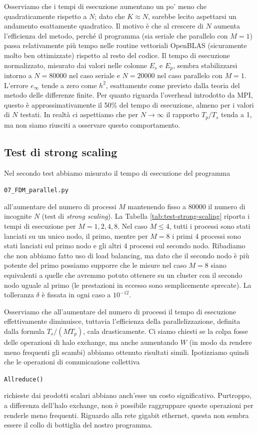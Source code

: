 \documentclass[a4paper,11pt]{article}
\newcommand{\code}[1]{\begin{small}\texttt{#1}\end{small}}
\begin{document}
Osserviamo che i tempi di esecuzione aumentano un po'
meno che quadraticamente rispetto a $N$; dato che
$K \approx N$, sarebbe lecito aspettarsi un andamento
esattamente quadratico. Il motivo è che al crescere
di $N$ aumenta l'efficienza del metodo, perché il programma
(sia seriale che parallelo con $M = 1$) passa relativamente più
tempo nelle routine vettoriali OpenBLAS
(sicuramente molto ben ottimizzate) rispetto al resto
del codice. Il tempo di esecuzione normalizzato, misurato dai
valori nelle colonne $E_s$ e $E_p$, sembra stabilizzarsi
intorno a $N = 80000$ nel caso seriale e $N = 20000$ nel
caso parallelo con $M = 1$.
L'errore $e_\infty$ tende a zero come $h^2$, esattamente
come previsto dalla teoria del metodo delle differenze finite.
Per quanto riguarda l'overhead introdotto da MPI, questo
è approssimativamente il 50\% del tempo di esecuzione,
almeno per i valori di $N$ testati. In realtà ci aspettiamo
che per $N \to \infty$ il rapporto $T_p/T_s$ tenda a 1,
ma non siamo riusciti a osservare questo comportamento.

\subsection{Test di strong scaling}
Nel secondo test abbiamo misurato il tempo di esecuzione
del programma \code{07\_FDM\_parallel.py}
all'aumentare del numero di processi $M$ mantenendo fisso
a 80000 il numero di incognite $N$ (test di \emph{strong scaling}).
La Tabella \ref{tab:test-strong-scaling} riporta i tempi
di esecuzione per $M = 1,2,4,8$. Nel caso $M \leq 4$,
tutti i processi sono stati lanciati su un unico nodo,
il primo, mentre per $M = 8$ i primi 4 processi sono stati
lanciati sul primo nodo e gli altri 4 processi sul secondo nodo.
Ribadiamo che non abbiamo fatto uso di load balancing,
ma dato che il secondo nodo è più potente del primo possiamo
supporre che le misure nel caso $M = 8$ siano equivalenti a quelle
che avremmo potuto ottenere su un cluster con il secondo nodo
uguale al primo (le prestazioni in eccesso sono semplicemente
sprecate). La tolleranza $\delta$ è fissata in ogni caso a $10^{-12}$.

Osserviamo che 	all'aumentare del numero di processi il tempo
di esecuzione effettivamente diminuisce, tuttavia l'efficienza
della parallelizzazione, definita dalla formula $T_s/(MT_p)$,
cala drasticamente. Ci siamo chiesti se la colpa fosse delle
operazioni di halo exchange, ma anche aumentando $W$
(in modo da rendere meno frequenti gli scambi) abbiamo
ottenuto risultati simili. Ipotizziamo quindi che
le operazioni di comunicazione collettiva \code{Allreduce()}
richieste dai prodotti scalari abbiano anch'esse
un costo significativo. Purtroppo, a differenza dell'halo
exchange, non è possibile raggruppare queste operazioni
per renderle meno frequenti. Riguardo alla rete gigabit ethernet,
questa non sembra essere il collo di bottiglia del nostro programma.
\end{document}
